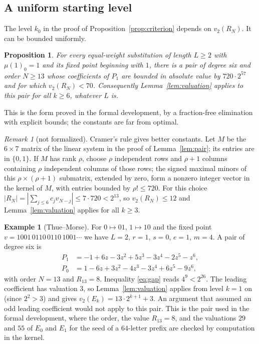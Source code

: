 \documentclass[11pt,reqno]{amsart}
\newtheorem{proposition}[theorem]{Proposition}
\theoremstyle{definition}
\newtheorem{example}[theorem]{Example}
\theoremstyle{remark}
\newtheorem{remark}[theorem]{Remark}
\newcommand{\vt}{v_2}
\begin{document}
\subsection{A uniform starting level}
The level $k_0$ in the proof of Proposition~\ref{prop:criterion} depends on
$\vt(R_N)$.  It can be bounded uniformly.

\begin{proposition}\label{prop:start}
For every equal-weight substitution of length $L\ge 2$ with $\mu(1)_0=1$
and its fixed point beginning with $1$, there is a pair of degree six and
order $N\ge 13$ whose coefficients of $P_1$ are bounded in absolute value
by $720\cdot 2^{57}$ and for which $\vt(R_N)<70$.  Consequently
Lemma~\ref{lem:valuation} applies to this pair for all $k\ge 6$, whatever
$L$ is.
\end{proposition}

This is the form proved in the formal development, by a fraction-free
elimination with explicit bounds; the constants are far from optimal.

\begin{remark}[not formalized]
Cramer's rule gives better constants.  Let $M$ be the $6\times 7$ matrix of
the linear system in the proof of Lemma~\ref{lem:pair}; its entries are in
$\{0,1\}$.  If $M$ has rank $\rho$, choose $\rho$ independent rows and
$\rho+1$ columns containing $\rho$ independent columns of those rows; the
signed maximal minors of this $\rho\times(\rho+1)$ submatrix, extended by
zero, form a nonzero integer vector in the kernel of $M$, with entries
bounded by $\rho!\le 720$.  For this choice
$|R_N|=|\sum_{j\le 6}c_jv_{N-j}|\le 7\cdot 720<2^{13}$, so $\vt(R_N)\le 12$
and Lemma~\ref{lem:valuation} applies for all $k\ge 3$.
\end{remark}

\begin{example}[Thue--Morse]\label{ex:tm}
For $0\mapsto 01$, $1\mapsto 10$ and the fixed point
$v=1001\,0110\,0110\,1001\cdots$ we have $L=2$, $r=1$, $s=0$, $e=1$,
$m=4$.  A pair of degree six is
\begin{align*}
  P_1&=-1+6z-3z^{2}+5z^{3}-3z^{4}-2z^{5}-z^{6},\\
  P_0&=1-6z+3z^{2}-4z^{3}-3z^{4}+6z^{5}-9z^{6},
\end{align*}
with order $N=13$ and $R_{13}=8$.  Inequality \eqref{eq:gap} reads
$4^{9}<2^{26}$.  The leading coefficient has valuation $3$, so
Lemma~\ref{lem:valuation} applies from level $k=1$ on (since $2^{2}>3$) and
gives $\vt(E_k)=13\cdot 2^{k+1}+3$.  An argument that assumed an odd
leading coefficient would not apply to this pair.  This is the pair used
in the formal development, where the order, the value $R_{13}=8$, and the
valuations $29$ and $55$ of $E_0$ and $E_1$ for the seed of a $64$-letter
prefix are checked by computation in the kernel.
\end{example}
\end{document}
